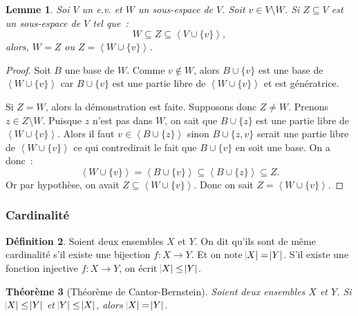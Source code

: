 \documentclass{article}
\newcommand{\eng}[1]{\left\langle#1\right\rangle}
\newtheorem{thm}{Théorème}[section]
\newtheorem{lem}[thm]{Lemme}
\theoremstyle{definition}
\newtheorem{déf}[thm]{Définition}
\theoremstyle{remark}
\begin{document}
		\begin{lem}\label{identitéSousEspaceInclus} Soi $V$ un e.v. et $W$ un sous-espace de $V$. Soit $v \in V \setminus W$. Si $Z \subseteq V$ est un sous-espace de
		$V$ tel que~: \[W \subseteq Z \subseteq \eng {V \cup \{v\}},\] alors, $W = Z$ ou $Z = \eng {W \cup \{v\}}$. \end{lem}

		\begin{proof} Soit $B$ une base de $W$. Comme $v \not \in W$, alors $B \cup \{v\}$ est une base de $\eng {W \cup \{v\}}$ car $B \cup \{v\}$ est une partie libre
		de $\eng {W \cup \{v\}}$ et est génératrice. 

		Si $Z = W$, alors la démonstration est faite. Supposons donc $Z \neq W$. Prenons $z \in Z \setminus W$. Puisque $z$ n'est pas dans $W$, on sait que
		$B \cup \{z\}$ est une partie libre de $\eng {W \cup \{v\}}$. Alors il faut $v \in \eng {B \cup \{z\}}$ sinon $B \cup \{z, v\}$ serait une partie libre de
		$\eng {W \cup \{v\}}$ ce qui contredirait le fait que $B \cup \{v\}$ en soit une base. On a donc~:
		\[\eng {W \cup \{v\}} = \eng {B \cup \{v\}} \subseteq \eng {B \cup \{z\}} \subseteq Z.\]
		Or par hypothèse, on avait $Z \subseteq \eng {W \cup \{v\}}$. Donc on sait $Z = \eng {W \cup \{v\}}$. \end{proof}

		\subsubsection{Cardinalité}
		\begin{déf} Soient deux ensembles $X$ et $Y$. On dit qu'ils sont de même cardinalité s'il existe une bijection $f : X \to Y$. Et on note $\abs X = \abs Y$.
		S'il existe une fonction injective $f : X \to Y$, on écrit $\abs X \leq \abs Y$. \end{déf}

		\begin{thm}[Théorème de Cantor-Bernstein]\label{Cantor-Bernstein} Soient deux ensembles $X$ et $Y$. Si $\abs X \leq \abs Y$ et $\abs Y \leq \abs X$,
		alors $\abs X = \abs Y$. \end{thm}
\end{document}
